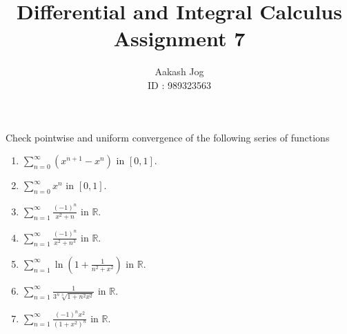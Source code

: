 \documentclass[fleqn, a4paper, 11pt, oneside]{amsart}
\title
{
	Differential and Integral Calculus\\
	Assignment 7
}
\author
{
	Aakash Jog\\
	ID : 989323563
}
\date{\formatdate{21}{5}{2015}}
\theoremstyle{definition}
\theoremstyle{theorem}
\begin{document}
	
\maketitle

\begin{question}
	Check pointwise and uniform convergence of the following series of functions
	\begin{enumerate}
		\item $\sum\limits_{n = 0}^{\infty} \left( x^{n + 1} - x^n \right)$ in $[0,1]$.
		\item $\sum\limits_{n = 0}^{\infty} x^n$ in $[0,1]$.
		\item $\sum\limits_{n = 1}^{\infty} \frac{(-1)^n}{x^2 + n}$ in $\mathbb{R}$.
		\item $\sum\limits_{n = 1}^{\infty} \frac{(-1)^n}{x^2 + n^3}$ in $\mathbb{R}$.
		\item $\sum\limits_{n = 1}^{\infty} \ln \left( 1 + \frac{1}{n^2 + x^2} \right)$ in $\mathbb{R}$.
		\item $\sum\limits_{n = 1}^{\infty} \frac{1}{3^n \sqrt[3]{1 + n^2 x^2}}$ in $\mathbb{R}$.
		\item $\sum\limits_{n = 1}^{\infty} \frac{(-1)^n x^2}{(1 + x^2)^n}$ in $\mathbb{R}$.
	\end{enumerate}
\end{question}
\end{document}
